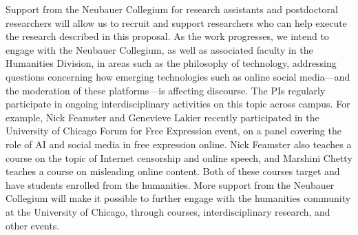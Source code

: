 Support from the Neubauer Collegium for research assistants and postdoctoral
researchers will allow us to recruit and support researchers who can help
execute the research described in this proposal. As the work progresses, we
intend to engage with the Neubauer Collegium, as well as associated faculty in
the Humanities Division, in areas such as the philosophy of technology,
addressing questions concerning how emerging technologies such as online
social media---and the moderation of these platforms---is affecting discourse.
The PIs regularly participate in ongoing interdisciplinary activities on this
topic across campus. For example, Nick Feamster and Genevieve Lakier recently
participated in the University of Chicago Forum for Free Expression event, on
a panel covering the role of AI and social media in free expression online.
Nick Feamster also teaches a course on the topic of Internet censorship and
online speech, and Marshini Chetty teaches a course on misleading online
content.  Both of these courses target and have students enrolled from the
humanities. More support from the Neubauer Collegium will make it possible to
further engage with the humanities community at the University of Chicago,
through courses, interdisciplinary research, and other events.
